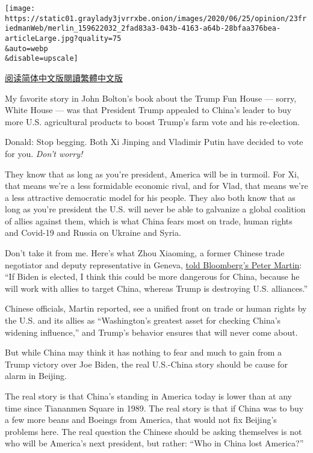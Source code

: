 \texttt{[image: https://static01.graylady3jvrrxbe.onion/images/2020/06/25/opinion/23friedmanWeb/merlin\_159622032\_2fad83a3-043b-4163-a64b-28bfaa376bea-articleLarge.jpg?quality=75\\\&auto=webp\\\&disable=upscale]}

\href{https://cn.nytimes3xbfgragh.onion/opinion/20200624/china-united-states-trump/}{阅读简体中文版}\href{https://cn.nytimes3xbfgragh.onion/opinion/20200624/china-united-states-trump/zh-hant/}{閱讀繁體中文版}

My favorite story in John Bolton's book about the Trump Fun House ---
sorry, White House --- was that President Trump appealed to China's
leader to buy more U.S. agricultural products to boost Trump's farm vote
and his re-election.

Donald: Stop begging. Both Xi Jinping and Vladimir Putin have decided to
vote for you. \emph{Don't worry!}

They know that as long as you're president, America will be in turmoil.
For Xi, that means we're a less formidable economic rival, and for Vlad,
that means we're a less attractive democratic model for his people. They
also both know that as long as you're president the U.S. will never be
able to galvanize a global coalition of allies against them, which is
what China fears most on trade, human rights and Covid-19 and Russia on
Ukraine and Syria.

Don't take it from me. Here's what Zhou Xiaoming, a former Chinese trade
negotiator and deputy representative in Geneva,
\href{https://www.bloomberg.com/news/articles/2020-06-15/china-warms-to-idea-of-four-more-years-of-trump-presidency}{told
Bloomberg's Peter Martin}: ``If Biden is elected, I think this could be
more dangerous for China, because he will work with allies to target
China, whereas Trump is destroying U.S. alliances.''

Chinese officials, Martin reported, see a unified front on trade or
human rights by the U.S. and its allies as ``Washington's greatest asset
for checking China's widening influence,'' and Trump's behavior ensures
that will never come about.

But while China may think it has nothing to fear and much to gain from a
Trump victory over Joe Biden, the real U.S.-China story should be cause
for alarm in Beijing.

The real story is that China's standing in America today is lower than
at any time since Tiananmen Square in 1989. The real story is that if
China was to buy a few more beans and Boeings from America, that would
not fix Beijing's problems here. The real question the Chinese should be
asking themselves is not who will be America's next president, but
rather: ``Who in China lost America?''

